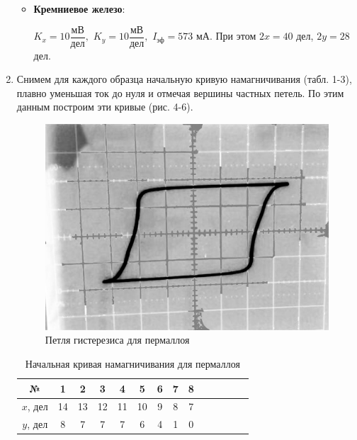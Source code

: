 \documentclass[a4paper]{article}
\begin{document}
\begin{enumerate}
\begin{itemize}
		      \item 	\textbf{Кремниевое железо}:

		            $K_{x}=10 \dfrac{\text{мВ}}{\text{дел}},$
		            $K_{y}=10 \dfrac{\text{мВ}}{\text{дел}},$
		            $I_\text{эф} = 573$ мА.
		            При этом $ 2x = 40$ дел, $2y = 28$ дел.

	      \end{itemize}



	\item Снимем для каждого образца начальную кривую намагничивания (табл. 1-3), плавно уменьшая ток до нуля и отмечая вершины частных петель. По этим данным построим эти кривые (рис. 4-6).

		      \begin{figure}[H]
			      \includegraphics[scale=0.2]{2.png}
			      \caption{Петля гистерезиса для пермаллоя}
		      \end{figure}
		      \begin{table}[H]
			      \caption{Начальная кривая намагничивания для пермаллоя}
			      \begin{center}
				      \begin{tabular}{|c|c|c|c|c|c|c|c|c|c|c|c|c|c|}
					      \hline
					      №          & 1   & 2   & 3   & 4   & 5   & 6   & 7   & 8 \\ \hline
					      $ x $, дел & 14 & 13 & 12 & 11 & 10 & 9 & 8 & 7 \\
					      $ y $, дел & 8 & 7 & 7 & 7 & 6 & 4 & 1 & 0 \\
					      \hline
				      \end{tabular}
			      \end{center}
		      \end{table}


\end{enumerate}
\end{document}
